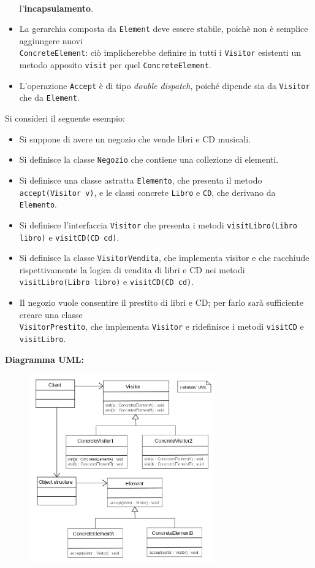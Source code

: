 \begin{solution}
\begin{itemize}
	\\l'\textbf{incapsulamento}.
	\item La gerarchia composta da \texttt{Element} deve essere stabile, poichè non è semplice aggiungere nuovi \\\texttt{ConcreteElement}: ciò implicherebbe definire in tutti i \texttt{Visitor} esistenti un metodo apposito \texttt{visit} per quel \texttt{ConcreteElement}.
	\item L'operazione \texttt{Accept} è di tipo \textit{double dispatch}, poiché dipende sia da \texttt{Visitor} che da \texttt{Element}.
\end{itemize}
Si consideri il seguente esempio:
\begin{itemize}
	\item Si suppone di avere un negozio che vende libri e CD musicali.
	\item Si definisce la classe \texttt{Negozio} che contiene una collezione di elementi.
	\item Si definisce una classe astratta \texttt{Elemento}, che presenta il metodo \texttt{accept(Visitor v)}, e le classi concrete \texttt{Libro} e \texttt{CD}, che derivano da \texttt{Elemento}.
	\item Si definisce l'interfaccia \texttt{Visitor} che presenta i metodi \texttt{visitLibro(Libro libro)} e \texttt{visitCD(CD cd)}.
	\item Si definisce la classe \texttt{VisitorVendita}, che implementa visitor e che racchiude rispettivamente la logica di vendita di libri e CD nei metodi \texttt{visitLibro(Libro libro)} e \texttt{visitCD(CD cd)}.
	\item Il negozio vuole consentire il prestito di libri e CD; per farlo sarà sufficiente creare una classe\\\texttt{VisitorPrestito}, che implementa \texttt{Visitor} e ridefinisce i metodi \texttt{visitCD} e \texttt{visitLibro}.
\end{itemize}

\textbf{Diagramma UML:}
\begin{figure}[htb!]
	\centering
	\includegraphics[width=8cm]{./immagini/visitorPattern.png}
\end{figure}
\end{solution}


